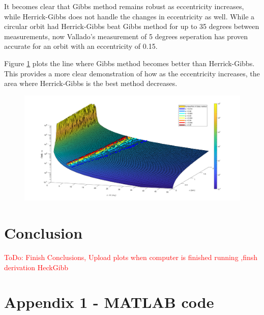 \documentclass[12pt]{article}
\begin{document}
It becomes clear that Gibbs method remains robust as eccentricity increases, while Herrick-Gibbs does not handle the changes in eccentricity as well. While a circular orbit had Herrick-Gibbs beat Gibbs method for up to 35 degrees between measurements, now Vallado's measurement of 5 degrees seperation has proven accurate for an orbit with an eccentricity of 0.15.\par 


Figure \ref{fig:eccecomp} plots the line where Gibbs method becomes better than Herrick-Gibbs. This provides a more clear demonstration of how as the eccentricity increases, the area  where Herrick-Gibbs is the best method decreases. 
\begin{figure}[H]
	\centering
	\includegraphics[width=0.7\linewidth]{ecceComp}
	\caption{}
	\label{fig:eccecomp}
\end{figure}




	
	\section{Conclusion}
	\textcolor{red}{ToDo: Finish Conclusions, Upload plots when computer is finished running ,finsh derivation HeckGibb}
		
		
		
		

		
		\newpage
		\singlespacing
		\section*{Appendix 1 - MATLAB code}
		
\end{document}

